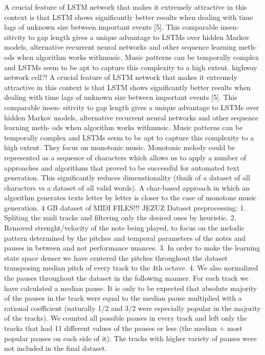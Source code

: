 \cite{Tikhonov2017} A crucial feature of LSTM network that makes it extremely attractive in this context is that LSTM shows significantly better results when dealing with time lags of unknown size between important events [5]. This comparable insen- sitivity to gap length gives a unique advantage to LSTMs over hidden Markov models, alternative recurrent neural networks and other sequence learning meth- ods when algorithm works withmusic. Music patterns can be temporally complex and LSTMs seem to be apt to capture this complexity to a high extent. highway network cell?! A crucial feature of LSTM network that makes it extremely attractive in this context is that LSTM shows significantly better results when dealing with time lags of unknown size between important events [5]. This comparable insen- sitivity to gap length gives a unique advantage to LSTMs over hidden Markov models, alternative recurrent neural networks and other sequence learning meth- ods when algorithm works withmusic. Music patterns can be temporally complex and LSTMs seem to be apt to capture this complexity to a high extent. They focus on monotonic music. Monotonic melody could be represented as a sequence of characters which allows us to apply a number of approaches and algorithms that proved to be successful for automated text generation. This significantly reduces dimenstionality (thnik of a dataset of all characters vs a dataset of all valid words). A char-based approach in which an algorithm generates texts letter by letter is closer to the case of monotone music generation. 4 GB dataset of MIDI FILES!!! JEZUZ Dataset preprocessing: 1. Spliting the midi tracks and filtering only the desired ones by heuristic. 2. Removed strenght/velocity of the note being played, to focus on the melodic pattern determined by the pitches and temporal parameters of the notes and pauses in between and not performance nuances. 3. In order to make the learning state space denser we have centered the pitches throughout the dataset transposing median pitch of every track to the 4th octave. 4. We also normalized the pauses throughout the dataset in the following manner. For each track we have calculated a median pause. It is only to be expected that absolute majority of the pauses in the track were equal to the median pause multiplied with a rational coefficient (naturally 1/2 and 3/2 were especially popular in the majority of the tracks). We counted all possible pauses in every track and left only the tracks that had 11 different values of the pauses or less (the median + most popular pauses on each side of it). The tracks with higher variety of pauses were not included in the final dataset.

